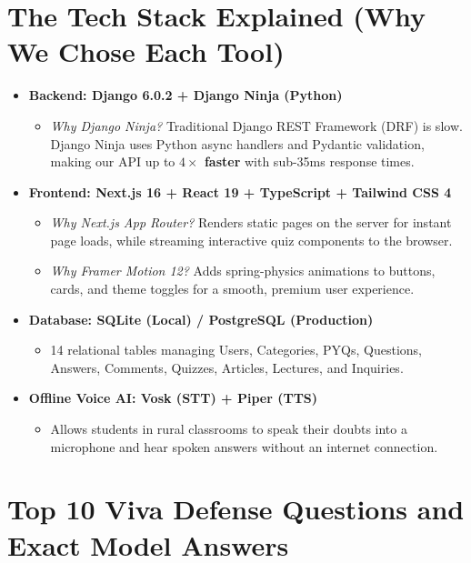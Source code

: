 \documentclass[11pt,a4paper]{article}
\begin{document}
\section{The Tech Stack Explained (Why We Chose Each Tool)}
\begin{itemize}[leftmargin=*]
    \item \textbf{Backend: Django 6.0.2 + Django Ninja (Python)}
    \begin{itemize}
        \item \textit{Why Django Ninja?} Traditional Django REST Framework (DRF) is slow. Django Ninja uses Python async handlers and Pydantic validation, making our API up to \textbf{$4\times$ faster} with sub-35ms response times.
    \end{itemize}
    \item \textbf{Frontend: Next.js 16 + React 19 + TypeScript + Tailwind CSS 4}
    \begin{itemize}
        \item \textit{Why Next.js App Router?} Renders static pages on the server for instant page loads, while streaming interactive quiz components to the browser.
        \item \textit{Why Framer Motion 12?} Adds spring-physics animations to buttons, cards, and theme toggles for a smooth, premium user experience.
    \end{itemize}
    \item \textbf{Database: SQLite (Local) / PostgreSQL (Production)}
    \begin{itemize}
        \item 14 relational tables managing Users, Categories, PYQs, Questions, Answers, Comments, Quizzes, Articles, Lectures, and Inquiries.
    \end{itemize}
    \item \textbf{Offline Voice AI: Vosk (STT) + Piper (TTS)}
    \begin{itemize}
        \item Allows students in rural classrooms to speak their doubts into a microphone and hear spoken answers without an internet connection.
    \end{itemize}
\end{itemize}

\section{Top 10 Viva Defense Questions and Exact Model Answers}
\end{document}
